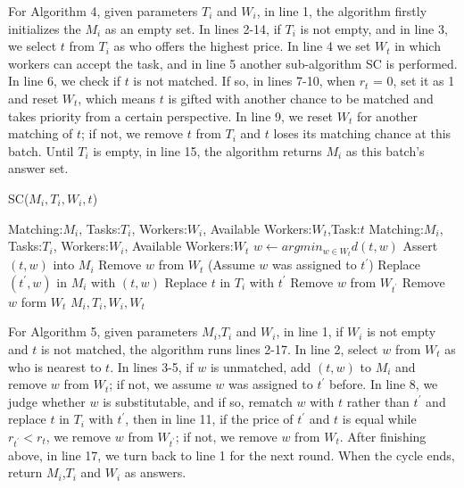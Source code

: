 \documentclass[color,twoside,amssymb,twocolumn]{article}
\begin{document}
For Algorithm 4, given parameters $T_i$ and $W_i$, in line 1, the algorithm firstly initializes the $M_i$ as an empty set. In lines 2-14, if $T_i$ is not empty, and in line 3, we select $t$ from $T_i$ as who offers the highest price. In line 4 we set $W_t$ in which workers can accept the task, and in line 5 another sub-algorithm SC is performed. In line 6, we check if $t$ is not matched. If so, in lines 7-10, when $r_t$ = 0, set it as 1 and reset $W_t$, which means $t$ is gifted with another chance to be matched and takes priority from a certain perspective. In line 9, we reset $W_t$ for another matching of $t$; if not, we remove $t$ from $T_i$ and $t$ loses its matching chance at this batch. Until $T_i$ is empty, in line 15, the algorithm returns $M_i$ as this batch's answer set.

\begin{algorithm}[h]
	\caption{SC($M_i,T_i,W_i,t$)}
	\label{alg5}
	\begin{algorithmic}[1]
		\REQUIRE Matching:$M_i$, Tasks:$T_i$, Workers:$W_i$, Available Workers:$W_t$,Task:$t$
		\ENSURE Matching:$M_i$, Tasks:$T_i$, Workers:$W_i$, Available Workers:$W_t$
		\STATE $w \leftarrow argmin_{w\in W_t}d(t,w)$
		\STATE Assert $(t,w)$ into $M_i$
		\STATE Remove $w$ from $W_t$
		\ELSE
		\STATE (Assume $w$ was assigned to $t^{'}$)
		\STATE Replace $(t^{'},w)$ in $M_i$ with $(t,w)$
		\STATE Replace $t$ in $T_i$ with $t^{'}$
		\STATE Remove $w$ from $W_{t^{'}}$
		\ENDIF
		\ELSE 
		\STATE Remove $w$ form $W_t$
		\ENDIF
		\ENDIF
		\ENDWHILE
		\RETURN $M_i,T_i,W_i,W_t$
	\end{algorithmic} 
\end{algorithm}

For Algorithm 5, given parameters $M_i$,$T_i$ and $W_i$, in line 1, if $W_i$ is not empty and $t$ is not matched, the algorithm runs lines 2-17. In line 2, select $w$ from $W_t$ as who is nearest to $t$. In lines 3-5, if $w$ is unmatched, add $(t,w)$ to $M_i$ and remove $w$ from $W_t$; if not, we assume $w$ was assigned to $t^{'}$ before. In line 8, we judge whether $w$ is substitutable, and if so, rematch $w$ with $t$ rather than $t^{'}$ and replace $t$ in $T_i$ with $t^{'}$, then in line 11, if the price of $t^{'}$ and $t$ is equal while $r_{t^{'}} < r_t$, we remove $w$ from $W_{t^{'}}$; if not, we remove $w$ from $W_t$. After finishing above, in line 17, we turn back to line 1 for the next round. When the cycle ends, return $M_i$,$T_i$ and $W_i$ as answers.
\end{document}
